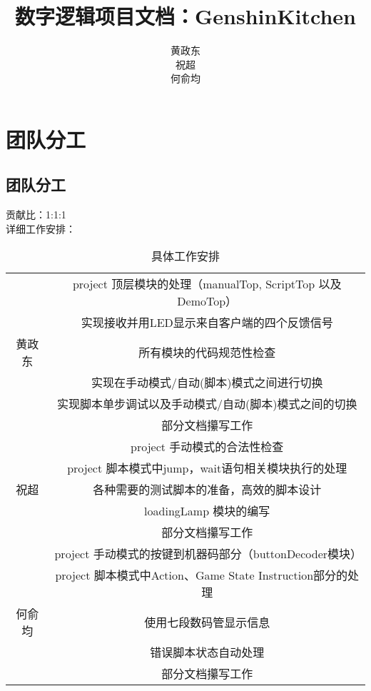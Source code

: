 \documentclass[12pt, a4paper]{ctexart}
\title{数字逻辑项目文档：GenshinKitchen}
\author{黄政东\\祝超\\何俞均}
\date{}
\begin{document}
\maketitle

\newpage
\section{团队分工}
\subsection{团队分工}
贡献比：1:1:1\\
详细工作安排：
\begin{table}[h]
	\centering
	\begin{tabular}{|c|c|}
		\hline
		~      & project 顶层模块的处理（manualTop, ScriptTop 以及 DemoTop） \\
		\cline{2-2}
		~      & 实现接收并用LED显示来自客户端的四个反馈信号                 \\
		\cline{2-2}
		黄政东 & 所有模块的代码规范性检查                                    \\
		\cline{2-2}
		~      & 实现在手动模式/自动(脚本)模式之间进行切换                   \\
		\cline{2-2}
		~      & 实现脚本单步调试以及手动模式/自动(脚本)模式之间的切换         \\
		\cline{2-2}
		~      & 部分文档攥写工作                                            \\
		\hline

		~      & project 手动模式的合法性检查                                \\
		\cline{2-2}
		~      & project 脚本模式中jump，wait语句相关模块执行的处理          \\
		\cline{2-2}
		祝超   & 各种需要的测试脚本的准备，高效的脚本设计                    \\
		\cline{2-2}
		~      & loadingLamp 模块的编写                                      \\
		\cline{2-2}
		~      & 部分文档攥写工作                                            \\

		\hline
		~      & project 手动模式的按键到机器码部分（buttonDecoder模块）     \\
		\cline{2-2}
		~      & project 脚本模式中Action、Game State Instruction部分的处理  \\
		\cline{2-2}
		何俞均 & 使用七段数码管显示信息                   \\
		\cline{2-2}
		~      & 错误脚本状态自动处理                                        \\
		\cline{2-2}
		~      & 部分文档攥写工作                                            \\
		\hline
	\end{tabular}
	\caption{具体工作安排}
\end{table}
\end{document}
